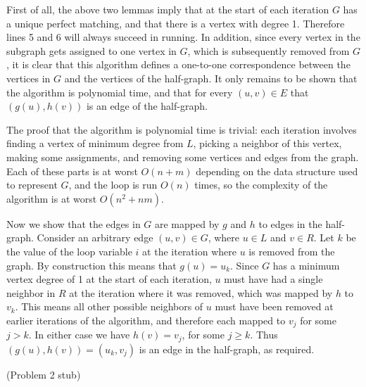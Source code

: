 \documentclass{hmcpset}
\begin{document}
\begin{solution}
\begin{enumerate}
First of all, the above two lemmas imply that at the start of each iteration
$G$ has a unique perfect matching, and that there is a vertex with degree 1.
Therefore lines 5 and 6 will always succeed in running.
In addition, since every vertex in the subgraph gets assigned to one vertex in $G$,
which is subsequently removed from $G$,
it is clear that this algorithm defines a one-to-one correspondence
between the vertices in $G$ and the vertices of the half-graph.
It only remains to be shown that the algorithm is polynomial time, and that
for every $(u, v) \in E$ that $(g(u), h(v))$ is an edge of the half-graph.

The proof that the algorithm is polynomial time is trivial: each iteration
involves finding a vertex of minimum degree from $L$, picking a neighbor
of this vertex, making some assignments, and removing some vertices and
edges from the graph. Each of these parts is at worst $O(n + m)$ depending on
the data structure used to represent $G$, and the loop is run $O(n)$ times,
so the complexity of the algorithm is at worst $O(n^2 + nm)$.

Now we show that the edges in $G$ are mapped by $g$ and $h$ to edges
in the half-graph. Consider an arbitrary edge
$(u, v) \in G$, where $u \in L$ and
$v \in R$. Let $k$ be the value of the loop variable $i$ at the iteration
where $u$ is removed from the graph. By construction this means that
$g(u) = u_k$.
Since $G$ has a minimum vertex degree of 1 at the start of each iteration,
$u$ must have had a single neighbor in $R$ at the iteration where it was
removed, which was mapped by $h$ to $v_k$.
This means all other possible neighbors of $u$ must have
been removed at earlier iterations of the algorithm, and therefore each
mapped to $v_j$ for some $j > k$. In either case we have $h(v) = v_j$,
for some $j \ge k$. Thus $(g(u), h(v)) = (u_k, v_j)$ is an edge
in the half-graph, as required.



\end{enumerate}
\end{solution}
\begin{problem}[2]
(Problem 2 stub)
\end{problem}
\end{document}
